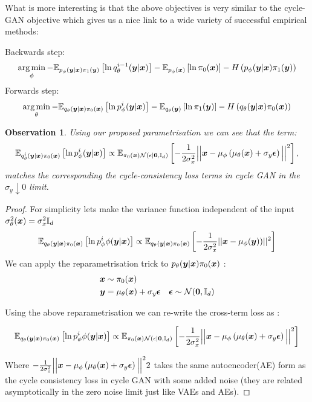 \documentclass[a4paper,12pt,twoside,openright]{report}
\newtheorem{observation}[theorem]{Observation}
\theoremstyle{definition}
\begin{document}
What is more interesting is that the above objectives is very similar to the cycle-GAN \citep{zhu2017unpaired} objective which gives us a nice link to a wide variety of successful empirical methods:

Backwards step:
\begin{align*}
\operatorname*{arg\,min}_\phi- \mathbb{E}_{p_{\phi}({\bm{y}}|{\bm{x}})\pi_1({\bm{y}})}\left[  \operatorname{ln}  q^{i-1}_{\theta}({\bm{y}}|{\bm{x}})\right] -  \mathbb{E}_{p_{\phi}({\bm{x}})}\left[ \operatorname{ln}  \pi_0({\bm{x}}) \right] - H\left(p_{\phi}({\bm{y}}|{\bm{x}})\pi_1({\bm{y}})\right)
\end{align*}
Forwards step:
\begin{align*}
\operatorname*{arg\,min}_\theta- \mathbb{E}_{q_{\theta}({\bm{y}}|{\bm{x}})\pi_0({\bm{x}})}\left[  \operatorname{ln}  p^i_{\phi}({\bm{y}}|{\bm{x}})\right] -  \mathbb{E}_{q_{\theta}({\bm{y}})}\left[ \operatorname{ln}  \pi_1({\bm{y}}) \right] - H\left(q_{\theta}({\bm{y}}|{\bm{x}})\pi_0({\bm{x}})\right)
\end{align*}

\begin{observation}\label{obs:cycle}
Using our proposed parametrisation we can see that the term:
$$\mathbb{E}_{q^i_{\theta}({\bm{y}}|{\bm{x}})\pi_0({\bm{x}})}\left[  \operatorname{ln}  p^i_{\phi}({\bm{y}}|{\bm{x}})\right] \propto \mathbb{E}_{\pi_0({\bm{x}}){\mathcal{N}}(\epsilon|\textbf{0},{\mathbb{I}_d} )}\left[  -  \frac{1}{2\sigma_x^2}\Big|\Big|{\bm{x}}- \mu_\phi\left(\mu_\theta({\bm{x}}) + \sigma_y \bm{\epsilon}\right) \Big|\Big|^2\right],$$
matches the corresponding the cycle-consistency loss terms in cycle GAN \cite{zhu2017unpaired} in the $\sigma_y \downarrow 0$ limit.
\end{observation}
\begin{proof}

For simplicity lets make the variance function independent of the input $\sigma^2_{\theta}({\bm{x}}) = \sigma_{x}^2 {\mathbb{I}_d}$ 
\begin{align*}
\mathbb{E}_{q_{\theta}({\bm{y}}|{\bm{x}})\pi_0({\bm{x}})}\left[  \operatorname{ln}  p^i_{\phi}{\phi}({\bm{y}}|{\bm{x}})\right] \propto \mathbb{E}_{q_{\theta}({\bm{y}}|{\bm{x}})\pi_0({\bm{x}})}\left[  -  \frac{1}{2\sigma_x^2}||{\bm{x}}- {\mu}_{\phi}({\bm{y}}))||^2\right]
\end{align*}
We can apply the reparametrisation trick \cite{kingma2013auto} to $p_{\theta}({\bm{y}}|{\bm{x}})\pi_0({\bm{x}})$ : 
\begin{align*}
    {\bm{x}} &\sim \pi_0({\bm{x}}) \\
    {\bm{y}} &= {\mu}_{\theta}({\bm{x}}) + \sigma_y \bm{\epsilon} \quad \bm{\epsilon} \sim {\mathcal{N}}(\textbf{0}, {\mathbb{I}_d})
\end{align*}

Using the above reparametrisation we can re-write the cross-term loss as : 

\begin{align*}
 \mathbb{E}_{q_{\theta}({\bm{y}}|{\bm{x}})\pi_0({\bm{x}})}\left[  \operatorname{ln}  p^i_{\phi}{\phi}({\bm{y}}|{\bm{x}})\right] \propto \mathbb{E}_{\pi_0({\bm{x}}){\mathcal{N}}(\epsilon|\textbf{0},{\mathbb{I}_d} )}\left[  -  \frac{1}{2\sigma_x^2}\Big|\Big|{\bm{x}}- \mu_\phi\left(\mu_\theta({\bm{x}}) + \sigma_y \bm{\epsilon}\right) \Big|\Big|^2\right]
\end{align*}

Where $ -  \frac{1}{2\sigma_x^2}\Big|\Big|{\bm{x}}- \mu_\phi\left(\mu_\theta({\bm{x}}) + \sigma_y \bm{\epsilon}\right) \Big|\Big|^22$ takes the same autoencoder(AE) form as the cycle consistency loss in cycle GAN with some added noise (they are related asymptotically in the zero noise limit just like VAEs and AEs).
\end{proof}
\end{document}
